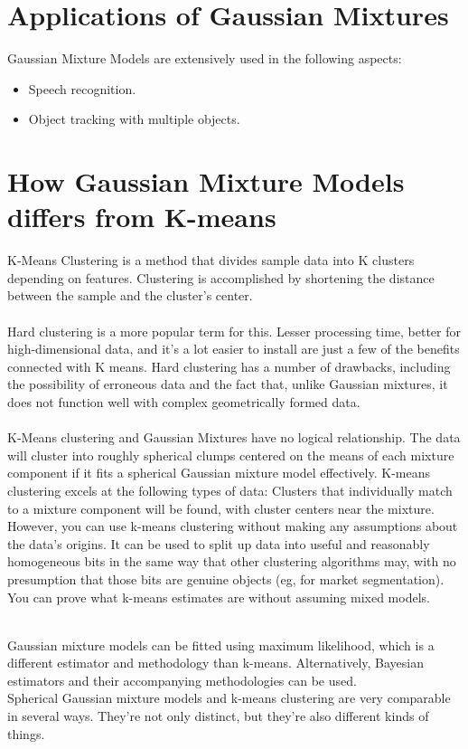 \documentclass[conference]{IEEEtran}
\begin{document}
\section{Applications of Gaussian Mixtures}

Gaussian Mixture Models are extensively used in the following aspects:
 \begin{itemize}
 \item Speech recognition.
 \item Object tracking with multiple objects.
\end{itemize}


\section{How Gaussian Mixture Models differs from K-means}

K-Means Clustering is a method that divides sample data into K clusters depending on features. Clustering is accomplished by shortening the distance between the sample and the cluster's center.
\\
\\ Hard clustering is a more popular term for this. Lesser processing time, better for high-dimensional data, and it's a lot easier to install are just a few of the benefits connected with K means. Hard clustering has a number of drawbacks, including the possibility of erroneous data and the fact that, unlike Gaussian mixtures, it does not function well with complex geometrically formed data.
\\
\\ K-Means clustering and Gaussian Mixtures have no logical relationship. The data will cluster into roughly spherical clumps centered on the means of each mixture component if it fits a spherical Gaussian mixture model effectively. K-means clustering excels at the following types of data: Clusters that individually match to a mixture component will be found, with cluster centers near the mixture.
\\ However, you can use k-means clustering without making any assumptions about the data's origins. It can be used to split up data into useful and reasonably homogeneous bits in the same way that other clustering algorithms may, with no presumption that those bits are genuine objects (eg, for market segmentation). You can prove what k-means estimates are without assuming mixed models.

\\Gaussian mixture models can be fitted using maximum likelihood, which is a different estimator and methodology than k-means. Alternatively, Bayesian estimators and their accompanying methodologies can be used.
\\Spherical Gaussian mixture models and k-means clustering are very comparable in several ways. They're not only distinct, but they're also different kinds of things.
\end{document}
